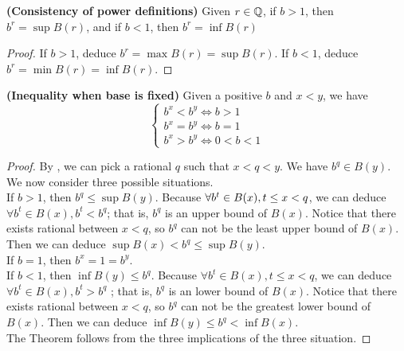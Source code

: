 \documentclass{report}
\begin{document}
\begin{theorem}
\label{1.4.3}
  \textbf{(Consistency of power definitions)} Given $r\in\mathbb{Q}$, if $b>1$, then  $b^r=\sup B(r)$, and if $b<1$, then  $b^r=\inf B(r)$
\end{theorem}
\begin{proof}
If $b>1$, deduce  $b^r=\max  B(r)=\sup B(r)$. If $b<1$, deduce $b^r=\min B(r)=\inf B(r)$.  
\end{proof}


\begin{theorem}
\label{1.4.4}
\textbf{(Inequality when base is fixed)} Given a positive $b$ and $x<y$, we have
 \begin{equation}
\begin{cases}
  b^x<b^y\iff b>1\\
  b^x=b^y\iff b=1\\
  b^x>b^y\iff 0<b<1
\end{cases}
\end{equation}
\end{theorem}
\begin{proof}
  By , we can pick a rational $q$ such that  $x<q<y$. We have $b^q\in B(y)$. We now consider three possible situations.\\



  If $b>1$, then $b^q\leq \sup B(y)$. Because $\forall b^t\in B(x), t\leq x<q$, we can  deduce $\forall b^t\in B(x), b^t<b^q$; that is, $b^q$ is an upper bound of $B(x)$. Notice that there exists rational between $x<q$, so  $b^q$ can not be the least upper bound of  $B(x)$.  Then we can deduce $\sup B(x)< b^q\leq \sup B(y)$.\\

  If $b=1$, then  $b^x=1=b^y$.\\

  If  $b<1$, then $\inf B(y)\leq b^q$. Because $\forall b^t\in B(x), t\leq x<q$, we can deduce $\forall b^t\in B(x), b^t>b^q$ ; that is, $b^q$ is an lower bound of  $B(x)$. Notice that there exists rational between $x<q$, so  $b^q$ can not be the greatest lower bound of  $B(x)$. Then we can deduce $\inf B(y)\leq b^q< \inf B(x)$.\\

  The Theorem follows from the three implications of the three situation. 
\end{proof}
\end{document}
